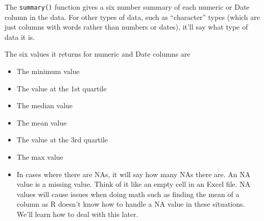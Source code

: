\documentclass[
]{krantz}
\providecommand{\tightlist}{%
  \setlength{\itemsep}{0pt}\setlength{\parskip}{0pt}}
\begin{document}
The \texttt{summary()} function gives a six number summary of each numeric or Date column in the data. For other types of data, such as ``character'' types (which are just columns with words rather than numbers or dates), it'll say what type of data it is.

The six values it returns for numeric and Date columns are

\begin{itemize}
\tightlist
\item
  The minimum value
\item
  The value at the 1st quartile
\item
  The median value
\item
  The mean value
\item
  The value at the 3rd quartile
\item
  The max value
\item
  In cases where there are NAs, it will say how many NAs there are. An NA value is a missing value. Think of it like an empty cell in an Excel file. NA values will cause issues when doing math such as finding the mean of a column as R doesn't know how to handle a NA value in these situations. We'll learn how to deal with this later.
\end{itemize}
\end{document}
